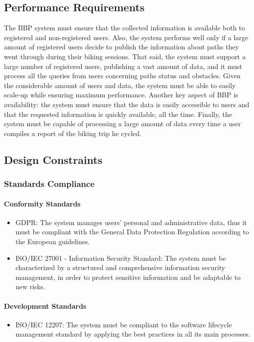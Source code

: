 \subsection{Performance Requirements}
The BBP system must ensure that the collected information is available both to registered and non-registered users. Also, the system performs well only if a large amount of registered users decide to publish the information about paths they went through during their biking sessions. That said, the system must support a large number of registered users, publishing a vast amount of data, and it must process all the queries from users concerning paths status and obstacles.
Given the considerable amount of users and data, the system must be able to easily scale-up while ensuring maximum performance. Another key aspect of BBP is availability: the system must ensure that the data is easily accessible to users and that the requested information is quickly available, all the time. Finally, the system must be capable of processing a large amount of data every time a user compiles a report of the biking trip he cycled.   

\subsection{Design Constraints}
\subsubsection{Standards Compliance}
\paragraph{Conformity Standards}
\begin{itemize}
    \item GDPR: The system manages users’ personal and administrative data, thus it must be compliant with the General Data Protection Regulation according to the European guidelines.
    \item ISO/IEC 27001 - Information Security Standard: The system must be characterized by a structured and comprehensive information security management, in order to protect sensitive information and be adaptable to new risks.
\end{itemize}

\paragraph{Development Standards}
\begin{itemize}
    \item ISO/IEC 12207: The system must be compliant to the software lifecycle management standard by applying the best practices in all its main processes.
\end{itemize}


